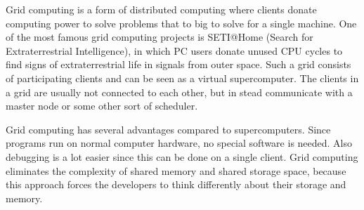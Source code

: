 Grid computing is a form of distributed computing where clients donate computing
power to solve problems that to big to solve for a single machine. One of the
most famous grid computing projects is SETI@Home (Search for Extraterrestrial
Intelligence), in which PC users donate unused CPU cycles to find signs of
extraterrestrial life in signals from outer space. Such a grid consists of
participating clients and can be seen as a virtual supercomputer. The clients in
a grid are usually not connected to each other, but in stead communicate with a
master node or some other sort of scheduler.
	
Grid computing has several advantages compared to supercomputers. Since programs
run on normal computer hardware, no special software is needed. Also debugging
is a lot easier since this can be done on a single client. Grid computing
eliminates the complexity of shared memory and shared storage space, because
this approach forces the developers to think differently about their storage and
memory.
	